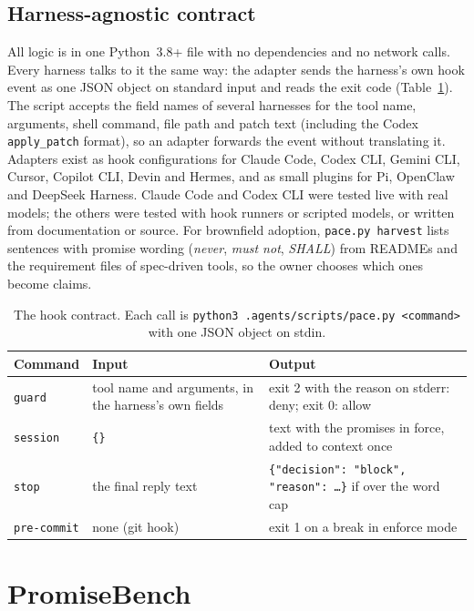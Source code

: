\documentclass[11pt]{article}
\begin{document}
\subsection{Harness-agnostic contract}

All logic is in one Python~3.8+ file with no dependencies and no network calls. Every harness talks to it the same way: the adapter sends the harness's own hook event as one JSON object on standard input and reads the exit code (Table~\ref{tab:contract}). The script accepts the field names of several harnesses for the tool name, arguments, shell command, file path and patch text (including the Codex \texttt{apply\_patch} format), so an adapter forwards the event without translating it. Adapters exist as hook configurations for Claude Code, Codex CLI, Gemini CLI, Cursor, Copilot CLI, Devin and Hermes, and as small plugins for Pi, OpenClaw and DeepSeek Harness. Claude Code and Codex CLI were tested live with real models; the others were tested with hook runners or scripted models, or written from documentation or source. For brownfield adoption, \texttt{pace.py harvest} lists sentences with promise wording (\emph{never}, \emph{must not}, \emph{SHALL}) from READMEs and the requirement files of spec-driven tools, so the owner chooses which ones become claims.

\begin{table}[t]
\centering\small
\caption{The hook contract. Each call is \texttt{python3 .agents/scripts/pace.py <command>} with one JSON object on stdin.}
\label{tab:contract}
\begin{tabular}{@{}lp{5.2cm}p{6.4cm}@{}}
\toprule
Command & Input & Output \\
\midrule
\texttt{guard} & tool name and arguments, in the harness's own fields & exit 2 with the reason on stderr: deny; exit 0: allow \\
\texttt{session} & \texttt{\{\}} & text with the promises in force, added to context once \\
\texttt{stop} & the final reply text & \texttt{\{"decision": "block", "reason": \ldots\}} if over the word cap \\
\texttt{pre-commit} & none (git hook) & exit 1 on a break in enforce mode \\
\bottomrule
\end{tabular}
\end{table}

\section{PromiseBench}
\label{sec:bench}
\end{document}

